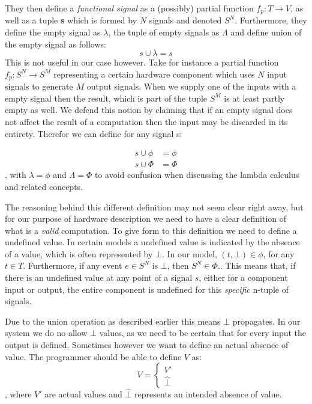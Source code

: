 They then define a \textit{functional signal} as a (possibly) partial function $f_p : T \rightarrow V$, as well as a tuple \textbf{s} which is formed by $N$ signals and denoted $S^N$.
Furthermore, they define the empty signal as $\lambda$, the tuple of empty signals as $\Lambda$ and define union of the empty signal as follows:
\[ s \cup \lambda = s \]
This is not useful in our case however. 
Take for instance a partial function $f_p : S^N \rightarrow S^M$ representing a certain hardware component which uses $N$ input signals to generate $M$ output signals.
When we supply one of the inputs with a empty signal then the result, which is part of the tuple $S^M$ is at least partly empty as well. 
We defend this notion by claiming that if an empty signal does not affect the result of a computation then the input may be discarded in its entirety.
Therefor we can define for any signal s:

\[
\begin{aligned}
    s \cup \phi &= \phi \\
    s \cup \Phi &= \Phi
\end{aligned}
\]
, with $\lambda = \phi$ and $\Lambda = \Phi$ to avoid confusion when discussing the lambda calculus and related concepts.

The reasoning behind this different definition may not seem clear right away, but for our purpose of hardware description we need to have a clear definition of what is a \textit{valid} computation.
To give form to this definition we need to define a undefined value.
In certain models a undefined value is indicated by the absence of a value, which is often represented by $\bot$.
In our model, $(t,\bot) \in \phi$, for any $t \in T$.
Furthermore, if any event $e \in S^N$ is $\bot$, then $S^N \in \Phi$..
This means that, if there is an undefined value at any point of a signal $s$, either for a component input or output, the entire component is undefined for this \textit{specific} n-tuple of signals.

Due to the union operation as described earlier this means $\bot$ propagates. 
In our system we do no allow $\bot$ values, as we need to be certain that for every input the output is defined.
Sometimes however we want to define an actual absence of value.
The programmer should be able to define $V$ as:
\[ 
V = 
\begin{cases}
    V'\\
    \hat{\bot}
\end{cases}
\]
, where $V'$ are actual values and $\hat{\bot}$ represents an intended absence of value.

